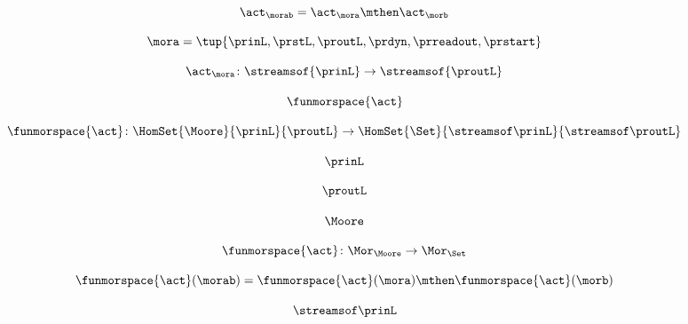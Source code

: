 \begin{forslides}
    \begin{equation}
        \label{eq:slides-processes-23}
        \act_{\morab} = \act_\mora \mthen \act_\morb
    \end{equation}

    \begin{equation}
        \label{eq:slides-processes-24}
        \mora = \tup{\prinL,\prstL,\proutL,\prdyn,\prreadout,\prstart}
    \end{equation}

    \begin{equation}
        \label{eq:slides-processes-25}
        \act_{\mora} \colon \streamsof{\prinL} \to \streamsof {\proutL}
    \end{equation}

    \begin{equation}
        \label{eq:slides-processes-26}
        \funmorspace{\act}
    \end{equation}

    \begin{equation}
        \label{eq:slides-processes-27}
        \funmorspace{\act} \colon  \HomSet{\Moore}{\prinL}{\proutL} \to \HomSet{\Set}{\streamsof\prinL}{\streamsof\proutL}
    \end{equation}

    \begin{equation}
        \label{eq:slides-processes-28}
        \prinL
    \end{equation}

    \begin{equation}
        \label{eq:slides-processes-29}
        \proutL
    \end{equation}

    \begin{equation}
        \label{eq:slides-processes-30}
        \Moore
    \end{equation}

    \begin{equation}
        \label{eq:slides-processes-31}
        \funmorspace{\act} \colon \Mor_\Moore \to \Mor_\Set
    \end{equation}

    \begin{equation}
        \label{eq:slides-processes-32}
        \funmorspace{\act}(\morab) = \funmorspace{\act}(\mora) \mthen \funmorspace{\act}(\morb)
    \end{equation}

    \begin{equation}
        \label{eq:slides-processes-33}
        \streamsof\prinL
    \end{equation}


\end{forslides}
